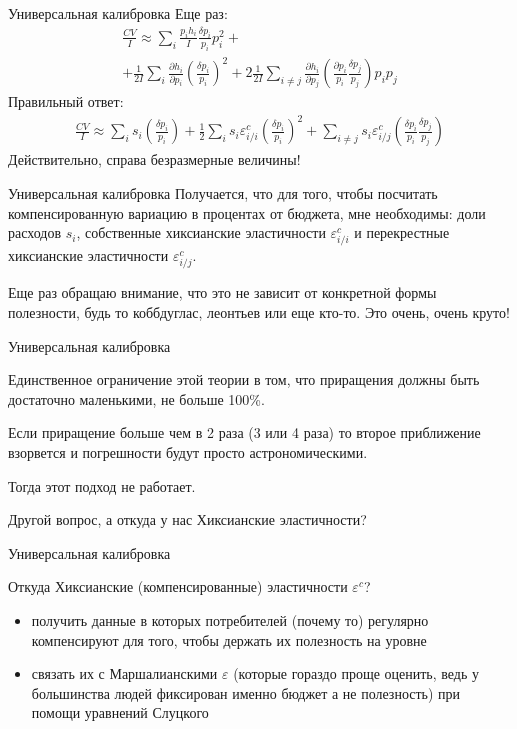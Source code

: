 \documentclass{beamer}
\begin{document}
\begin{frame}{Универсальная калибровка}
Еще раз:
\begin{gather*}
	\frac{CV}{I} \approx \sum_i \frac{p_i h_i}{I} \frac{\delta p_i}{p_i}p_i^2  + \\ + \frac{1}{2I}\sum_i \frac{\partial h_i}{\partial p_i} (\frac{\delta p_i}{p_i})^2 +  2\frac{1}{2I}\sum_{i \neq j} \frac{\partial h_i}{\partial p_j} (\frac{\partial p_i}{p_i}\frac{\delta p_j}{p_j})p_ip_j
	\end{gather*}
Правильный ответ:
	\begin{gather*}
	\frac{CV}{I} \approx \sum_i s_i (\frac{\delta p_i}{p_i}) + \frac{1}{2}\sum_i s_i \varepsilon^c_{i/i} (\frac{\delta p_i}{p_i})^2 + \sum_{i \neq j} s_i \varepsilon^c_{i/j}(\frac{\delta p_i}{p_i}\frac{\delta p_j}{p_j})
\end{gather*}
Действительно, справа безразмерные величины!
\end{frame}

\begin{frame}{Универсальная калибровка}
Получается, что для того, чтобы посчитать компенсированную вариацию в процентах от бюджета, мне необходимы: доли расходов $s_i$, собственные хиксианские эластичности $\varepsilon^c_{i/i}$ и перекрестные хиксианские эластичности $\varepsilon^c_{i/j}$. 

Еще раз обращаю внимание, что это \alert{не зависит от конкретной формы полезности}, будь то коббдуглас, леонтьев или еще кто-то. Это очень, очень круто!

\end{frame}

\begin{frame}{Универсальная калибровка}

Единственное ограничение этой теории в том, что приращения должны быть достаточно маленькими, не больше 100\%.

Если приращение больше чем в 2 раза (3 или 4 раза) то второе приближение взорвется и погрешности будут просто астрономическими. 

Тогда этот подход не работает. 

Другой вопрос, а откуда у нас Хиксианские эластичности?

\end{frame}

\begin{frame}{Универсальная калибровка}

Откуда Хиксианские (компенсированные) эластичности $\varepsilon^c$?

\begin{itemize}
  \item получить данные в которых потребителей (почему то) регулярно компенсируют для того, чтобы держать их полезность на уровне
  \item связать их с Маршалианскими $\varepsilon$ (которые гораздо проще оценить, ведь у большинства людей фиксирован именно бюджет а не полезность) при помощи уравнений Слуцкого
\end{itemize}

\end{frame}
\end{document}
